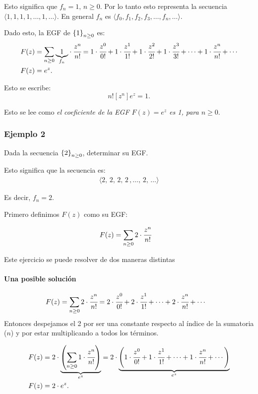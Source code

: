 Esto significa que $f_n=1,\,n\geq0$. Por lo tanto esto representa la secuencia $\langle1,1,1,1,\dots,1,\dots\rangle$. 
En general $f_n$ es $\langle f_0,f_1,f_2,f_3,\dots,f_n,\dots\rangle$.

Dado esto, la EGF de $\left\{1\right\}_{n\geq0}$ es:
\begin{align*}
F(z)&=\sum_{n\geq0}{\underset{f_n}{\underbrace{1}}\cdot \cfrac{z^{n}}{n!}}=1\cdot\cfrac{z^{0}}{0!}+1\cdot\cfrac{z^{1}}{1!}+1\cdot\cfrac{z^{2}}{2!}+1\cdot\cfrac{z^{3}}{3!}+\cdots+1\cdot\cfrac{z^{n}}{n!}+\cdots\\
F(z)&=e^z.
\end{align*}

Esto se escribe:
$$n![z^n]e^z=1.$$

Esto se lee como \textit{el coeficiente de la EGF $F(z)=e^z$ es 1, para $n\geq0$}.

\subsubsection{Ejemplo 2}

Dada la secuencia $\left\{2\right\}_{n\geq0}$, determinar su EGF.

Esto significa que la secuencia es:
\begin{align*}
\langle2,\,2,\,2,\,2\,,\dots,\,2,\,\dots\rangle
\end{align*}

Es decir, $f_n=2$. 

Primero definimos $F(z)$ como su EGF:

\begin{align*}
F(z)&=\sum_{n\geq0}{2\cdot \cfrac{z^{n}}{n!}}
\end{align*}

Este ejercicio se puede resolver de dos maneras distintas

\paragraph{Una posible solución}

\begin{align*}
F(z)&=\sum_{n\geq0}{2\cdot \cfrac{z^{n}}{n!}}=2\cdot\cfrac{z^{0}}{0!}+2\cdot\cfrac{z^{1}}{1!}+\cdots+2\cdot\cfrac{z^{n}}{n!}+\cdots
\end{align*}
Entonces despejamos el 2 por ser una constante respecto al índice de la sumatoria ($n$) y por estar multiplicando a todos los términos.

\begin{align*}
F(z)&=2\cdot\underset{e^z}{\underbrace{\left(\sum_{n\geq0}{1\cdot \cfrac{z^{n}}{n!}}\right)}}=2\cdot\underset{e^z}{\underbrace{\left(1\cdot\cfrac{z^{0}}{0!}+1\cdot\cfrac{z^{1}}{1!}+\cdots+1\cdot\cfrac{z^{n}}{n!}+\cdots\right)}}\\
F(z)&=2\cdot e^z.
\end{align*}

